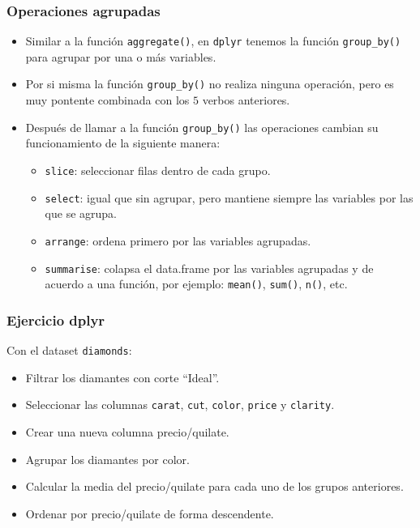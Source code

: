 \documentclass{beamer}
\begin{document}
\begin{frame}
\frametitle{Operaciones agrupadas}

\begin{itemize}
\item Similar a la función \texttt{aggregate()}, en \texttt{dplyr} tenemos la función \texttt{group\_by()} para agrupar por una o más variables.
\item Por si misma la función \texttt{group\_by()} no realiza ninguna operación, pero es muy pontente combinada con los $5$ verbos anteriores.
\item Después de llamar a la función \texttt{group\_by()} las operaciones cambian su funcionamiento de la siguiente manera:
\begin{itemize}
\item \texttt{slice}: seleccionar filas dentro de cada grupo.
\item \texttt{select}: igual que sin agrupar, pero mantiene siempre las variables por las que se agrupa.
\item \texttt{arrange}: ordena primero por las variables agrupadas.
\item \texttt{summarise}: colapsa el data.frame por las variables agrupadas y de acuerdo a una función, por ejemplo: \texttt{mean()}, \texttt{sum()}, \texttt{n()}, etc.
\end{itemize}
\end{itemize}
\end{frame}

\begin{frame}
\frametitle{Ejercicio dplyr}
Con el dataset \texttt{diamonds}:

\begin{itemize}
\item Filtrar los diamantes con corte ``Ideal''.
\item Seleccionar las columnas \texttt{carat}, \texttt{cut}, \texttt{color}, \texttt{price} y \texttt{clarity}.
\item Crear una nueva columna precio/quilate.
\item Agrupar los diamantes por color.
\item Calcular la media del precio/quilate para cada uno de los grupos anteriores.
\item Ordenar por precio/quilate de forma descendente.
\end{itemize}

\end{frame}
\end{document}
